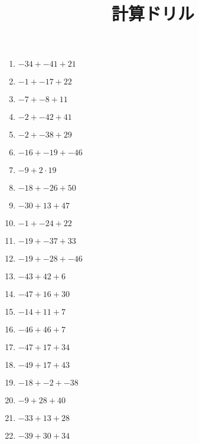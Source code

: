 \documentclass[9pt,dvipdfmx,a4paper]{article}
\begin{document}
    
\title{計算ドリル} 
\date{} 
\maketitle
\begin{multicols}{2}
 \begin{enumerate}

\item
$ -34 + -41 + 21$

\item
$ -1 + -17 + 22$

\item
$ -7 + -8 + 11$

\item
$ -2 + -42 + 41$

\item
$ -2 + -38 + 29$

\item
$ -16 + -19 + -46$

\item
$ -9 + 2 \cdot 19$

\item
$ -18 + -26 + 50$

\item
$ -30 + 13 + 47$

\item
$ -1 + -24 + 22$

\item
$ -19 + -37 + 33$

\item
$ -19 + -28 + -46$

\item
$ -43 + 42 + 6$

\item
$ -47 + 16 + 30$

\item
$ -14 + 11 + 7$

\item
$ -46 + 46 + 7$

\item
$ -47 + 17 + 34$

\item
$ -49 + 17 + 43$

\item
$ -18 + -2 + -38$

\item
$ -9 + 28 + 40$

\item
$ -33 + 13 + 28$

\item
$ -39 + 30 + 34$


\end{enumerate}
\end{multicols}
\end{document}
